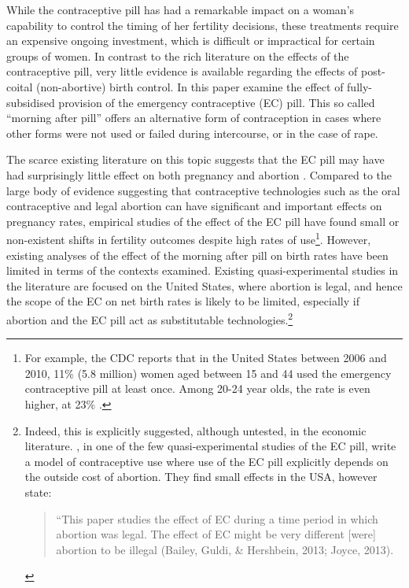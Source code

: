 While the contraceptive pill has had a remarkable impact on a woman's capability
to control the timing of her fertility decisions, these treatments require an
expensive ongoing investment, which is difficult or impractical for certain 
groups of women.  In contrast to the rich literature on the effects of the 
contraceptive pill, very little evidence is available regarding the effects of 
post-coital (non-abortive) birth control.  In this paper \person examine the 
effect of fully-subsidised provision of the emergency contraceptive (EC) pill.  
This so called ``morning after pill'' offers an alternative form of 
contraception in cases where other forms were not used or failed during 
intercourse, or in the case of rape.

The scarce existing literature on this topic suggests that the EC pill may have 
had surprisingly little effect on both pregnancy and abortion 
\citep{Grossetal2014,Durrance2013}. Compared to the large body of evidence 
suggesting that contraceptive technologies such as the oral contraceptive and 
legal abortion can have significant and important effects on pregnancy rates, 
empirical studies of the effect of the EC pill have found small or non-existent 
shifts in fertility outcomes despite high rates of use\footnote{For example, 
the CDC reports that in the United States between 2006 and 2010, 11\% (5.8 
million) women aged between 15 and 44 used the emergency contraceptive pill at 
least once.  Among 20-24 year olds, the rate is even higher, at 23\% 
\citep{Danielsetal2013}.}.  However, existing analyses of the effect of the 
morning after pill on birth rates have been limited in terms of the contexts 
examined.  Existing quasi-experimental studies in the literature are focused on 
the United States, where abortion is legal, and hence the scope of the EC on 
net birth rates is likely to be limited, especially if abortion and the EC pill
act as substitutable technologies.\footnote{Indeed, this is explicitly 
suggested, although untested, in the economic literature. \citet{Grossetal2014}, 
in one of the few quasi-experimental studies of the EC pill, write a model of 
contraceptive use where use of the EC pill explicitly depends on the outside 
cost of abortion. They find small effects in the USA, however state:
     \begin{quote}
     ``This paper studies the effect of EC during a time period in which
     abortion was legal. The effect of EC might be very different [were]
     abortion to be illegal (Bailey, Guldi, \& Hershbein, 2013; Joyce,
     2013).
     \end{quote}}

